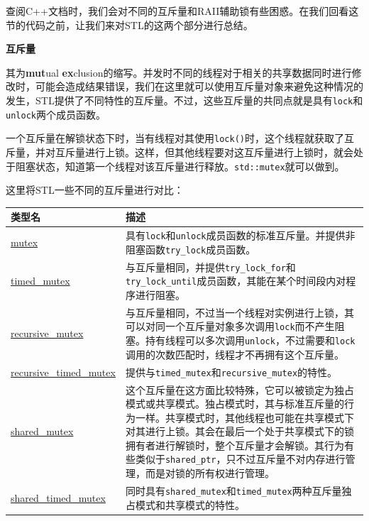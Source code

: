
查阅C++文档时，我们会对不同的互斥量和RAII辅助锁有些困惑。在我们回看这节的代码之前，让我们来对STL的这两个部分进行总结。

\textbf{互斥量}

其为\textbf{mut}ual \textbf{ex}clusion的缩写。并发时不同的线程对于相关的共享数据同时进行修改时，可能会造成结果错误，我们在这里就可以使用互斥量对象来避免这种情况的发生，STL提供了不同特性的互斥量。不过，这些互斥量的共同点就是具有\texttt{lock}和\texttt{unlock}两个成员函数。

一个互斥量在解锁状态下时，当有线程对其使用\texttt{lock()}时，这个线程就获取了互斥量，并对互斥量进行上锁。这样，但其他线程要对这互斥量进行上锁时，就会处于阻塞状态，知道第一个线程对该互斥量进行释放。\texttt{std::mutex}就可以做到。

这里将STL一些不同的互斥量进行对比：

\begin{table}[htbp]\centering
\begin{tabularx}{\textwidth}{lX}
\toprule
类型名 & 描述 \\
\midrule
\href{http://zh.cppreference.com/w/cpp/thread/mutex}{mutex} & 具有\texttt{lock}和\texttt{unlock}成员函数的标准互斥量。并提供非阻塞函数\texttt{try\_lock}成员函数。 \\
\href{http://zh.cppreference.com/w/cpp/thread/timed_mutex}{timed\_mutex} & 与互斥量相同，并提供\texttt{try\_lock\_for}和\texttt{try\_lock\_until}成员函数，其能在某个时间段内对程序进行阻塞。 \\
\href{http://zh.cppreference.com/w/cpp/thread/recursive_mutex}{recursive\_mutex} & 与互斥量相同，不过当一个线程对实例进行上锁，其可以对同一个互斥量对象多次调用\texttt{lock}而不产生阻塞。持有线程可以多次调用\texttt{unlock}，不过需要和\texttt{lock}调用的次数匹配时，线程才不再拥有这个互斥量。 \\
\href{http://zh.cppreference.com/w/cpp/thread/recursive_timed_mutex}{recursive\_timed\_mutex} & 提供与\texttt{timed\_mutex}和\texttt{recursive\_mutex}的特性。 \\
\href{http://zh.cppreference.com/w/cpp/thread/shared_mutex}{shared\_mutex} & 这个互斥量在这方面比较特殊，它可以被锁定为独占模式或共享模式。独占模式时，其与标准互斥量的行为一样。共享模式时，其他线程也可能在共享模式下对其进行上锁。其会在最后一个处于共享模式下的锁拥有者进行解锁时，整个互斥量才会解锁。其行为有些类似于\texttt{shared\_ptr}，只不过互斥量不对内存进行管理，而是对锁的所有权进行管理。 \\
\href{http://zh.cppreference.com/w/cpp/thread/shared_timed_mutex}{shared\_timed\_mutex} & 同时具有\texttt{shared\_mutex}和\texttt{timed\_mutex}两种互斥量独占模式和共享模式的特性。 \\
\bottomrule
\end{tabularx}
\end{table}


